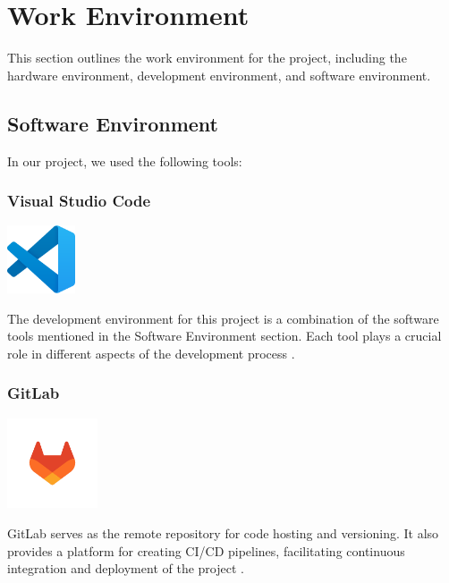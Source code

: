 \section{Work Environment}

This section outlines the work environment for the project, including the hardware environment, development environment, and software environment.

\subsection{Software Environment}

In our project, we used the following tools:

\subsubsection*{Visual Studio Code}
\begin{center}
\includegraphics[width=0.15\textwidth]{Images/logos/vscode.png}
\label{fig:vscode}
\end{center}
The development environment for this project is a combination of the software tools mentioned in the Software Environment section. Each tool plays a crucial role in different aspects of the development process \cite{vscode}.

\clearpage

\subsubsection*{GitLab}
\begin{center}
\includegraphics[width=0.2\textwidth]{Images/logos/gitlab-logo-500.png}
\label{fig:gitlab}
\end{center}
GitLab serves as the remote repository for code hosting and versioning. It also provides a platform for creating CI/CD pipelines, facilitating continuous integration and deployment of the project \cite{gitlab}.

